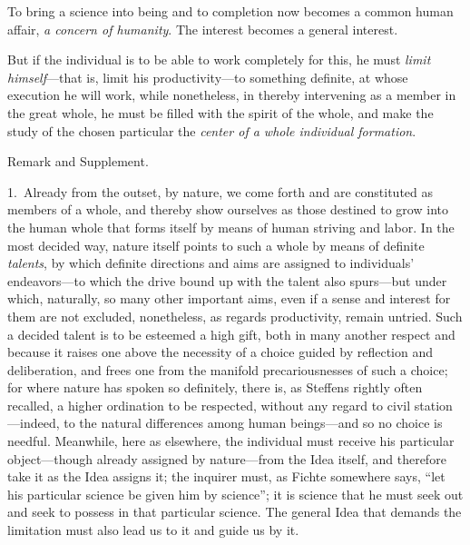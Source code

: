 \documentclass[12pt,a4paper]{book}
\begin{document}
To bring a science into being and to completion now becomes a common human affair, \emph{a
concern of humanity}. The interest becomes a general interest.

But if the individual is
to be able to work completely for this, he must \emph{limit himself}---that is, limit
his productivity---to something definite, at whose execution he will work, while
nonetheless, in thereby intervening as a member in the great whole, he must be filled
with the spirit of the whole, and make the study of the chosen particular the
\emph{center of a whole individual formation}.

\begin{center}Remark and Supplement.\end{center}
1.~Already from the outset, by nature, we come forth and are constituted as members of a
whole, and thereby show ourselves as those destined to grow into the human whole that
forms itself by means of human striving and labor. In the most decided way, nature
itself points to such a whole by means of definite \emph{talents}, by which definite directions
and aims are assigned to individuals' endeavors---to which the drive bound up with the
talent also spurs---but under which, naturally, so many other important aims, even if a
sense and interest for them are not excluded, nonetheless, as regards productivity,
remain untried. Such a decided talent is to be esteemed a high gift, both in many another
respect and because it raises one above the necessity of a choice guided by reflection
and deliberation, and frees one from the manifold precariousnesses of such a choice; for
where nature has spoken so definitely, there is, as Steffens rightly often recalled, a
higher ordination to be respected, without any regard to civil station---indeed, to the
natural differences among human beings---and so no choice is needful. Meanwhile, here as
elsewhere, the individual must receive his particular object---though already assigned by
nature---from the Idea itself, and therefore take it as the Idea assigns it; the inquirer
must, as Fichte somewhere says, ``let his particular science be given him by science'';
it is science that he must seek out and seek to possess in that particular science. The
general Idea that demands the limitation must also lead us to it and guide us by it.
\end{document}
